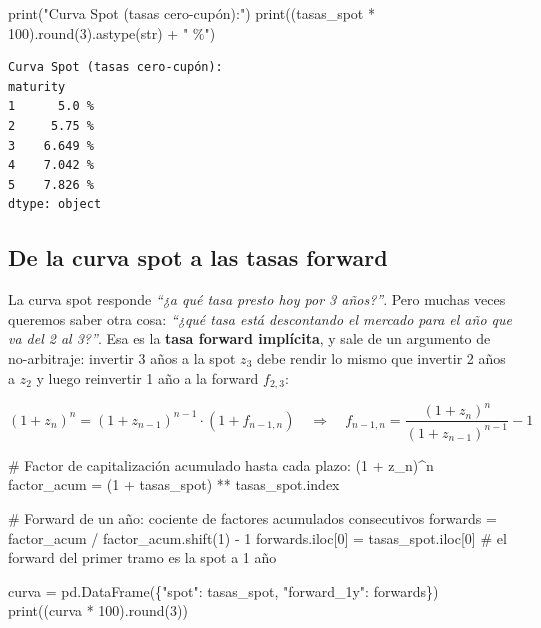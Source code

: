 \documentclass[
  spanish,
  letterpaper,
  DIV=11,
  numbers=noendperiod]{scrreprt}
\newenvironment{Shaded}{\begin{snugshade}}{\end{snugshade}}
\newcommand{\BuiltInTok}[1]{\textcolor[rgb]{0.00,0.23,0.31}{#1}}
\newcommand{\CommentTok}[1]{\textcolor[rgb]{0.37,0.37,0.37}{#1}}
\newcommand{\DecValTok}[1]{\textcolor[rgb]{0.68,0.00,0.00}{#1}}
\newcommand{\NormalTok}[1]{\textcolor[rgb]{0.00,0.23,0.31}{#1}}
\newcommand{\OperatorTok}[1]{\textcolor[rgb]{0.37,0.37,0.37}{#1}}
\newcommand{\StringTok}[1]{\textcolor[rgb]{0.13,0.47,0.30}{#1}}
\begin{document}
\begin{Shaded}
\begin{Highlighting}[]
\BuiltInTok{print}\NormalTok{(}\StringTok{"Curva Spot (tasas cero{-}cupón):"}\NormalTok{)}
\BuiltInTok{print}\NormalTok{((tasas\_spot }\OperatorTok{*} \DecValTok{100}\NormalTok{).}\BuiltInTok{round}\NormalTok{(}\DecValTok{3}\NormalTok{).astype(}\BuiltInTok{str}\NormalTok{) }\OperatorTok{+} \StringTok{" \%"}\NormalTok{)}
\end{Highlighting}
\end{Shaded}

\begin{verbatim}
Curva Spot (tasas cero-cupón):
maturity
1      5.0 %
2     5.75 %
3    6.649 %
4    7.042 %
5    7.826 %
dtype: object
\end{verbatim}

\subsection{De la curva spot a las tasas
forward}\label{de-la-curva-spot-a-las-tasas-forward}

La curva spot responde \emph{``¿a qué tasa presto hoy por 3 años?''}.
Pero muchas veces queremos saber otra cosa: \emph{``¿qué tasa está
descontando el mercado para el año que va del 2 al 3?''}. Esa es la
\textbf{tasa forward implícita}, y sale de un argumento de no-arbitraje:
invertir 3 años a la spot \(z_3\) debe rendir lo mismo que invertir 2
años a \(z_2\) y luego reinvertir 1 año a la forward \(f_{2,3}\):

\[(1 + z_n)^n = (1 + z_{n-1})^{n-1} \cdot (1 + f_{n-1,n}) \quad\Rightarrow\quad f_{n-1,n} = \frac{(1 + z_n)^n}{(1 + z_{n-1})^{n-1}} - 1\]

\label{forward-rates}
\begin{Shaded}
\begin{Highlighting}[]
\CommentTok{\# Factor de capitalización acumulado hasta cada plazo: (1 + z\_n)\^{}n}
\NormalTok{factor\_acum }\OperatorTok{=}\NormalTok{ (}\DecValTok{1} \OperatorTok{+}\NormalTok{ tasas\_spot) }\OperatorTok{**}\NormalTok{ tasas\_spot.index}

\CommentTok{\# Forward de un año: cociente de factores acumulados consecutivos}
\NormalTok{forwards }\OperatorTok{=}\NormalTok{ factor\_acum }\OperatorTok{/}\NormalTok{ factor\_acum.shift(}\DecValTok{1}\NormalTok{) }\OperatorTok{{-}} \DecValTok{1}
\NormalTok{forwards.iloc[}\DecValTok{0}\NormalTok{] }\OperatorTok{=}\NormalTok{ tasas\_spot.iloc[}\DecValTok{0}\NormalTok{]  }\CommentTok{\# el forward del primer tramo es la spot a 1 año}

\NormalTok{curva }\OperatorTok{=}\NormalTok{ pd.DataFrame(\{}\StringTok{"spot"}\NormalTok{: tasas\_spot, }\StringTok{"forward\_1y"}\NormalTok{: forwards\})}
\BuiltInTok{print}\NormalTok{((curva }\OperatorTok{*} \DecValTok{100}\NormalTok{).}\BuiltInTok{round}\NormalTok{(}\DecValTok{3}\NormalTok{))}
\end{Highlighting}
\end{Shaded}
\end{document}
